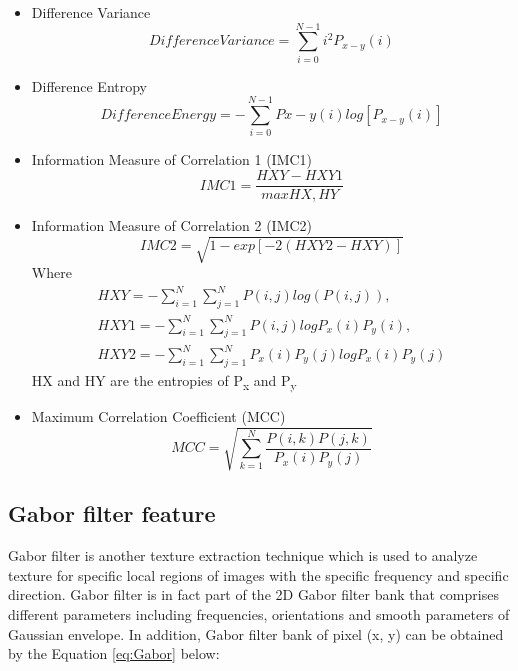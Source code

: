 \documentclass[review]{elsarticle}
\begin{document}
\begin{itemize}
	\item Difference Variance 
	\begin{equation}
	Difference Variance = \sum_{i=0}^{N-1}i^2 P_{x-y}(i)
	\end{equation}

	\item Difference Entropy 
	\begin{equation}
	Difference Energy= - \sum_{i=0}^{N-1} P{x-y}(i) log [P_{x-y}(i)]
	\end{equation}
	
	\item Information Measure of Correlation 1 (IMC1)
	\begin{equation}
	IMC1= \dfrac{HXY-HXY1}{max{HX,HY}}
	\end{equation}
	
	\item Information Measure of Correlation 2 (IMC2)
	\begin{equation}
	IMC2=\sqrt{ 1-exp[-2(HXY2-HXY)]}
	\end{equation}
	Where 
	\begin{equation}
	\begin{split}
	HXY=- \sum_{i=1}^N \sum_{j=1}^N P(i,j) log(P(i,j)),\\
	HXY1= -\sum_{i=1}^N \sum_{j=1}^N P(i,j) log{P_x(i)P_y(i)},\\
	HXY2=-\sum_{i=1}^N \sum_{j=1}^N P_x(i)P_y(j) log{P_x(i)P_y(j)}
	\end{split}
	\end{equation}
	HX and HY are the entropies of P\textsubscript{x} and P\textsubscript{y}
	
	\item Maximum Correlation Coefficient (MCC) 
	\begin{equation}
	MCC= \sqrt{\sum_{k=1}^N \dfrac{P(i,k)P(j,k)}{P_x(i)P_y(j)}}
	\end{equation}
\end{itemize}


\subsection{Gabor filter feature}
\label{subsec:gabor}
Gabor filter is another texture extraction technique which is used to analyze texture for specific local regions of images with the specific frequency and specific direction. Gabor filter is in fact part of the 2D Gabor filter bank that comprises different parameters including frequencies, orientations and smooth parameters of Gaussian envelope. In addition, Gabor filter bank of pixel (x, y) can be obtained by the Equation \ref{eq:Gabor} below:
\end{document}
